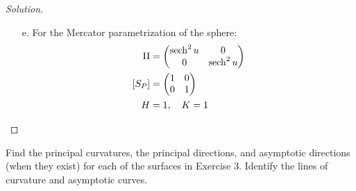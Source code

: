 \documentclass[Shifrin_Solutions_Spring_2015]{subfiles}
\begin{document}
\begin{proof}[Solution]
\begin{itemize}
\item[e.]  For the Mercator parametrization of the sphere:
\begin{align*}
\mathrm{II} & = \begin{pmatrix} \operatorname{\mathrm{sech}}^2 u &  0\\ 0 & \operatorname{\mathrm{sech}}^2 u \end{pmatrix} \\
\left[S_P\right] & = \begin{pmatrix} 1  & 0 \\ 0 & 1 \end{pmatrix} \\
H & = 1, \quad K = 1
\end{align*}

\end{itemize}
\end{proof}



\begin{exercise}
Find the principal curvatures, the principal directions, and asymptotic directions (when they exist) for each of the surfaces in Exercise 3. Identify the lines of curvature and asymptotic curves.
\end{exercise}
\end{document}
